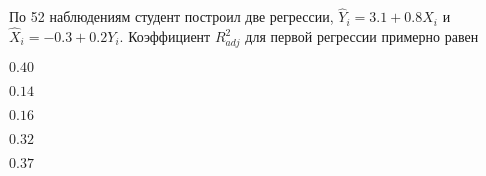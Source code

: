 
\begin{question}
По 52 наблюдениям студент построил две регрессии, \(\hat Y_i = 3.1 + 0.8X_i\) и \(\hat X_i = -0.3 + 0.2Y_i\).
Коэффициент \(R^2_{adj}\) для первой регрессии примерно равен
\begin{answerlist}
  \item \(0.40\)
  \item \(0.14\)
  \item \(0.16\)
  \item \(0.32\)
  \item \(0.37\)
\end{answerlist}
\end{question}


